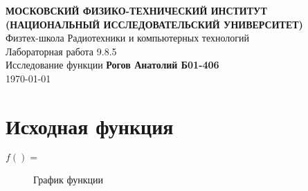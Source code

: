 \documentclass[12pt, letterpaper]{report}
\begin{document}
\begin{titlepage}
\begin{center}
\vspace*{1cm}
\textbf{МОСКОВСКИЙ ФИЗИКО-ТЕХНИЧЕСКИЙ ИНСТИТУТ (НАЦИОНАЛЬНЫЙ ИССЛЕДОВАТЕЛЬСКИЙ УНИВЕРСИТЕТ)}\\
\vspace{0.5cm} Физтех-школа Радиотехники и компьютерных технологий\\
\vspace{5cm} \LARGE{Лабораторная работа 9.8.5\\
Исследование функции}
\vfill
\large{\textbf{Рогов Анатолий Б01-406}} \\
\large \today
\vspace{0.8cm}
\end{center}
\end{titlepage}
\chapter{Исходная функция}
\hfil $f() = $\\
\begin{figure}[h]
\centering
{}
\caption{График функции}
\end{figure}
\end{document}
